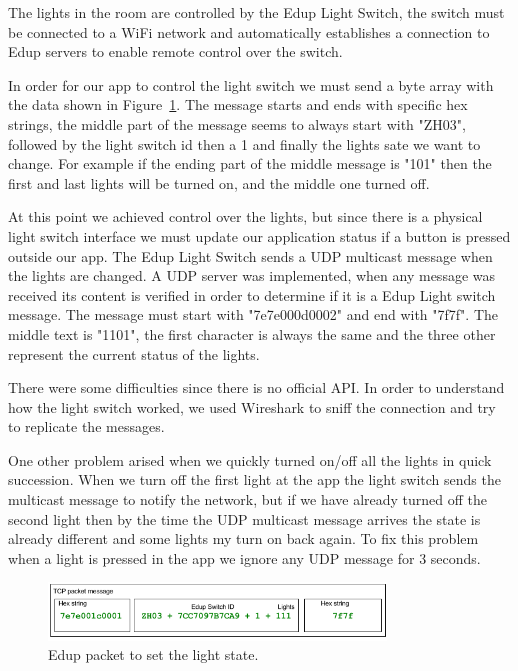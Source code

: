 The lights in the room are controlled by the Edup Light Switch, the switch must be connected to a WiFi network and automatically establishes a connection to Edup servers to enable remote control over the switch.

In order for our app to control the light switch we must send a byte array with the data shown in Figure~\ref{edup_imp}.
The message starts and ends with specific hex strings, the middle part of the message seems to always start with "ZH03", followed by the light switch id then a 1 and finally the lights sate we want to change. For example if the ending part of the middle message is "101" then the first and last lights will be turned on, and the middle one turned off.

At this point we achieved control over the lights, but since there is a physical light switch interface we must update our application status if a button is pressed outside our app.
The Edup Light Switch sends a \ac{UDP} multicast message when the lights are changed. A \ac{UDP} server was implemented, when any message was received its content is verified in order to determine if it is a Edup Light switch message. The message must start with "7e7e000d0002" and end with "7f7f". The middle text is "1101", the first character is always the same and the three other represent the current status of the lights.

There were some difficulties since there is no official API. In order to understand how the light switch worked, we used Wireshark to sniff the connection and try to replicate the messages.

One other problem arised when we quickly turned on/off all the lights in quick succession. When we turn off the first light at the app the light switch sends the multicast message to notify the network, but if we have already turned off the second light then by the time the \ac{UDP} multicast message arrives the state is already different and some lights my turn on back again. To fix this problem when a light is pressed in the app we ignore any \ac{UDP} message for 3 seconds.



\begin{figure}[h]
\centering
\includegraphics[width=0.8\textwidth]{Figures/Edup_imp}
\caption{Edup packet to set the light state.}
\label{edup_imp}
\end{figure}


